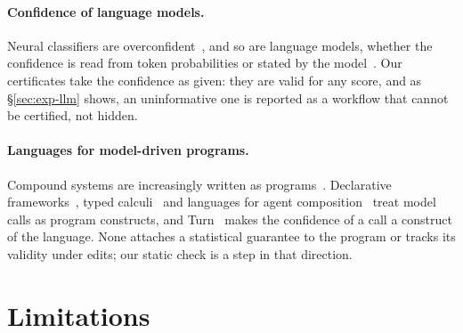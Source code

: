 \documentclass[11pt]{article}
\theoremstyle{definition}
\theoremstyle{remark}
\begin{document}
\paragraph{Confidence of language models.} Neural classifiers are
overconfident~\citep{guo2017calibration}, and so are language models, whether the confidence
is read from token probabilities or stated by the model~\citep{tian2023just,xiong2024can}.
Our certificates take the confidence as given: they are valid for any score, and as
\S\ref{sec:exp-llm} shows, an uninformative one is reported as a workflow that cannot be
certified, not hidden.

\paragraph{Languages for model-driven programs.} Compound systems are increasingly written
as programs~\citep{zaharia2024compound}. Declarative
frameworks~\citep{khattab2023dspy}, typed calculi~\citep{liu2026lambda} and languages for
agent composition~\citep{kizito2026turn} treat model calls as program constructs, and
Turn~\citep{kizito2026turn} makes the confidence of a call a construct of the language. None attaches a statistical guarantee to
the program or tracks its validity under edits; our static check is a step in that direction.

\section{Limitations}\label{sec:limits}
\end{document}
